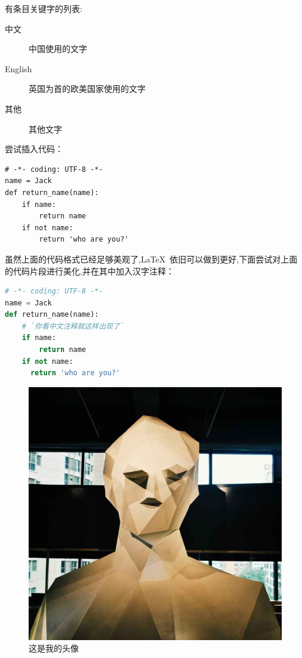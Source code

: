 \documentclass[UTF8]{ctexart} %
\begin{document}
有条目关键字的列表:

\begin{description}
 \item[中文] 中国使用的文字
 \item[English] 英国为首的欧美国家使用的文字
 \item[其他] 其他文字
\end{description}

尝试插入代码：

\begin{verbatim}
# -*- coding: UTF-8 -*-
name = Jack
def return_name(name):
    if name:
        return name
    if not name:
        return 'who are you?'
\end{verbatim}

虽然上面的代码格式已经足够美观了,\LaTeX\ 依旧可以做到更好,下面尝试对上面的代码片段进行美化,并在其中加入汉字注释：
\lstset{
 basicstyle=\sffamily,
 keywordstyle=\bfseries,
 commentstyle=\rmfamily\itshape,
 stringstyle=\ttfamily,
 columns=flexible,
 numbers=left,
 numberstyle=\footnotesize,
 escapechar=`
 }
\begin{lstlisting}[language=Python]
# -*- coding: UTF-8 -*-
name = Jack
def return_name(name):
    # `你看中文注释就这样出现了`
    if name:
        return name
    if not name:
      return 'who are you?'

\end{lstlisting}

\begin{figure}[H] %
\centering
\includegraphics[scale=0.3]{webwxgeticon.jpg} %
\caption{这是我的头像}
\label{fig:xiaotu}
\end{figure}
\end{document}

